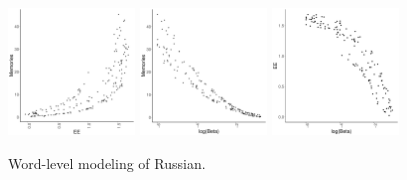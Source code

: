 \documentclass[11pt,letterpaper]{article}
\begin{document}
\begin{figure}
\includegraphics[width=0.3\textwidth]{code/figures/ru-words-ee-mem.pdf}
\includegraphics[width=0.3\textwidth]{code/figures/ru-words-logbeta-mem.pdf}
\includegraphics[width=0.3\textwidth]{code/figures/ru-words-logbeta-ee.pdf}
	\caption{Word-level modeling of Russian.}\label{fig:rug-logbeta}
\end{figure}
\end{document}
